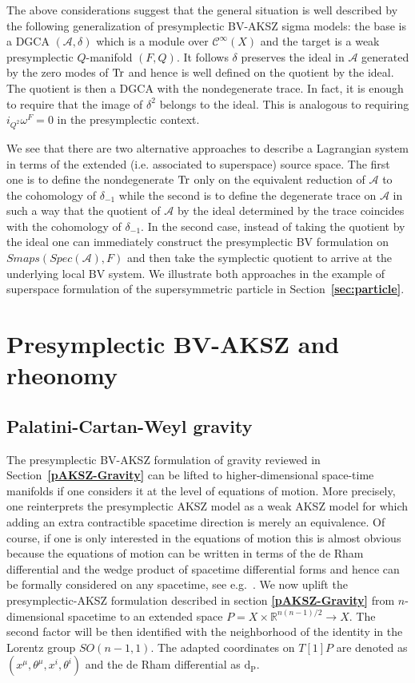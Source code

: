 \documentclass[a4paper,12pt]{article}
\numberwithin{equation}{section} %
\newcommand{\bref}[1]{\textbf{\ref{#1}}}
\newcommand{\algA}{\mathcal{A}}
\newcommand{\cC}{\mathcal{C}}
\newcommand{\fR}{\mathbb{R}}
\def\tr{{\rm Tr}}
\numberwithin{equation}{section}
\newcommand{\atheta}{\theta}
\newcommand{\dP}{\mathrm{d_P}}
\begin{document}
The above considerations suggest that the general situation is well described by the following generalization of presymplectic BV-AKSZ sigma models: the base is a DGCA $(\algA,\delta)$  which is a module over $\cC^\infty(X)$ and the target is a weak presymplectic $Q$-manifold $(F,Q)$. It follows $\delta$ preserves the ideal in $\algA$ generated by the zero modes of $\tr$ and hence is well defined on the quotient by the ideal. The quotient is then a DGCA with the nondegenerate trace. In fact, it is enough to require that the image of $\delta^2$ belongs to the ideal. This is analogous to requiring $i_{Q^2}\omega^F=0$ in the presymplectic context. 

We see that there are two alternative approaches to describe a Lagrangian system in terms of the extended (i.e. associated to superspace) source space. The first one is to define the nondegenerate $\tr$ only on the equivalent reduction of $\algA$ to the cohomology of $\delta_{-1}$ while the second is to define the degenerate trace on $\algA$ in such a way that the quotient of $\algA$ by the ideal determined by the trace coincides with the cohomology of $\delta_{-1}$. In the second case, instead of taking the quotient by the ideal one can  immediately construct the presymplectic BV formulation on $Smaps(Spec(\algA),F)$ and then take the symplectic quotient to arrive at the underlying local BV system. We illustrate both approaches in the example of  superspace formulation of the supersymmetric particle in Section~\bref{sec:particle}.









\section{Presymplectic BV-AKSZ and rheonomy}
\label{sec:rheonomy}
\subsection{Palatini-Cartan-Weyl gravity}
The presymplectic BV-AKSZ formulation of gravity reviewed in Section~\bref{pAKSZ-Gravity} can be lifted to higher-dimensional space-time manifolds if one considers it at the level of equations of motion. More precisely, one reinterprets the presymplectic AKSZ model as a weak AKSZ model for which adding an extra contractible spacetime direction is merely an equivalence.  
Of course, if one is only interested in the equations of motion this is almost obvious because the equations of motion can be written in terms of the de Rham differential and the wedge product of spacetime differential forms and hence can be formally considered on any spacetime, see e.g.~\cite{Castellani:1991et}. We now uplift the presymplectic-AKSZ formulation described in section \bref{pAKSZ-Gravity} from $n$-dimensional spacetime to an extended space $P=X\times \fR^{n(n-1)/2} \to X$. The second factor will be then identified with the neighborhood  of the identity in the Lorentz group $SO(n-1,1)$. The adapted coordinates on $T[1]P$ are denoted as $(x^\mu, \atheta^\mu, x^i, \atheta^i)$ and the de Rham differential as $\dP$.
\end{document}
